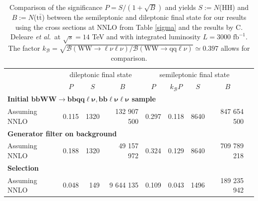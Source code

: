 \documentclass[10pt,a4paper]{article}
\newcommand{\cc}[1]{\multicolumn{1}{c}{#1}} %
\newcommand{\level}[1]{ \multicolumn{5}{l}{\hspace{-1em}\textbf{#1}}}
\newcommand{\T}{\rule{0pt}{2.9ex}}       %
\renewcommand{\tt}{\ensuremath{\text{t}\bar{\text{t}}}}
\newcommand{\lnu}{$\ell\nu$}
\newcommand{\sAN}{$\sigma_1$}
\newcommand{\BR}{\mathcal{B}}
\newcommand{\etal}{\emph{et al.}}
\begin{document}
\begin{table}[t]
	\centering
	\caption{Comparison of the significance $P=S/(1+\sqrt{B})$ and yields $S:=N$(HH) and $B:=N$(\tt) between the semileptonic and dileptonic final state for our results using the cross sections at NNLO from Table \ref{sigma} and the results by C. Deleare \etal\ at $\sqrt{s}=14$ TeV and with integrated luminosity $L = 3000 \text{ fb}^{-1}$. The factor $k_{\BR}=\sqrt{\BR(\text{WW}\rightarrow\text{\lnu\lnu})/\BR(\text{WW}\rightarrow\text{qq\lnu})} \simeq 0.397$ allows for comparison.} \vspace{5pt}  %
	\label{comparison}
	\begin{tabular}{@{\quad}llrrllrrr@{}}
	
	\toprule
	& \multicolumn{3}{c}{dileptonic final state} & \multicolumn{4}{c}{semileptonic final state} \\
	\cmidrule(r){2-4} \cmidrule(r){5-8}
	                       & \cc{$P$} & \cc{$S$} & \cc{$B$} & \cc{$P$} & \cc{$k_{\BR}P$} & \cc{$S$} & \cc{$B$} \\
	\midrule
	\level{Initial $\bm{\text{bbWW} \rightarrow \text{bb}qq\ell\nu, \text{bb}\ell\nu\ell\nu}$ sample} \T\\
	Assuming NNLO          & 0.115 &   1320  & 132 907 500 & 0.297 & 0.118 &   8640  & 847 654 500  \\
	\level{Generator filter on background} \T\\
	Assuming NNLO          & 0.188 &   1320  &  49 157 972 & 0.324 & 0.129 &   8640  & 709 789 218  \\
	\level{Selection} \T\\
 	Assuming NNLO          & 0.048 &    149  &   9 644 135 & 0.109 & 0.043 &   1496  & 189 235 942  \\

\end{tabular}
\end{table}
\end{document}
